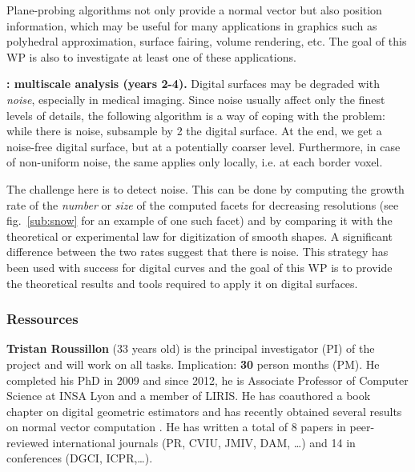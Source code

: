 Plane-probing algorithms not only provide a normal vector but also position information, which may be useful for many applications in graphics such as polyhedral approximation, surface fairing, volume rendering, etc. The goal of this WP is also to investigate at least one of these applications.   

\noindent\textbf{\wpScale: multiscale analysis (years 2-4).} Digital surfaces may be degraded with \emph{noise}, especially in medical imaging. Since noise usually affect only the finest levels of details, the following algorithm is a way of coping with the problem: while there is noise, subsample by 2 the digital surface. At the end, we get a noise-free digital surface, but at a potentially coarser level. Furthermore, in case of non-uniform noise, the same applies only locally, i.e. at each border voxel.  

The challenge here is to detect noise. This can be done by computing the growth rate of the \emph{number} or \emph{size} of the computed facets for decreasing resolutions (see fig.~\ref{sub:snow} for an example of one such facet) and by comparing it with the theoretical or experimental law for digitization of smooth shapes. A significant difference between the two rates suggest that there is noise. 
This strategy has been used with success for digital curves \cite{Kerautret2012} and the goal of this WP is to provide the theoretical results and tools required to apply it on digital surfaces. 


\subsubsection{Ressources}
\label{sec:ressources}

\textbf{Tristan Roussillon} (33 years old) is the principal investigator (PI) of the project
and will work on all tasks. Implication: \textbf{30} person months (PM). 
He completed his PhD in 2009 and since 2012, he is Associate Professor of Computer Science at INSA Lyon
and a member of LIRIS. 
He has coauthored a book chapter on digital geometric estimators \cite{Coeurjolly2012} and
has recently obtained several results on normal vector computation \cite{LPRTCS2016,LPRDGCI2016,LPRJMIV2017}.    
He has written a total of 8 papers in peer-reviewed international journals (PR, CVIU, JMIV, DAM, \ldots) 
and 14 in conferences (DGCI, ICPR,\ldots).

